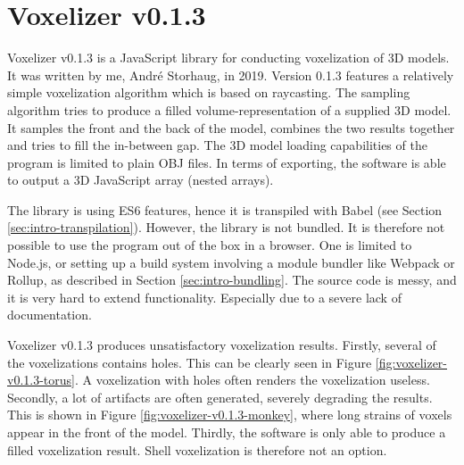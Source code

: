 \section{Voxelizer v0.1.3}
\label{sec:voxelizer-v013}
Voxelizer v0.1.3 \cite{voxelizer-v0.1.3} is a JavaScript library for conducting voxelization of 3D models. It was written by me, André Storhaug, in 2019. Version 0.1.3 features a relatively simple voxelization algorithm which is based on raycasting. The sampling algorithm tries to produce a filled volume-representation of a supplied 3D model. It samples the front and the back of the model, combines the two results together and tries to fill the in-between gap. The 3D model loading capabilities of the program is limited to plain OBJ files. In terms of exporting, the software is able to output a 3D JavaScript array (nested arrays).

The library is using ES6 features, hence it is transpiled with Babel (see Section \ref{sec:intro-transpilation}). However, the library is not bundled. It is therefore not possible to use the program out of the box in a browser. One is limited to Node.js, or setting up a build system involving a module bundler like Webpack or Rollup, as described in Section \ref{sec:intro-bundling}. The source code is messy, and it is very hard to extend functionality. Especially due to a severe lack of documentation.

Voxelizer v0.1.3 produces unsatisfactory voxelization results. Firstly, several of the voxelizations contains holes. This can be clearly seen in Figure \ref{fig:voxelizer-v0.1.3-torus}. A voxelization with holes often renders the voxelization useless. Secondly, a lot of artifacts are often generated, severely degrading the results. This is shown in Figure \ref{fig:voxelizer-v0.1.3-monkey}, where long strains of voxels appear in the front of the model. Thirdly, the software is only able to produce a filled voxelization result. Shell voxelization is therefore not an option.

